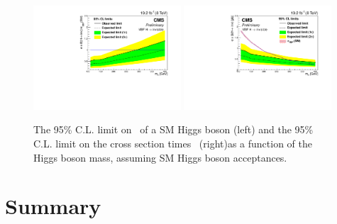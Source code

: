 \begin{figure}[h!]
  \begin{center}
    \includegraphics[width=0.49\textwidth]{Chapter07/Images/vbflimit.pdf} %
    \includegraphics[width=0.49\textwidth]{Chapter07/Images/vbfxslimit.pdf}
 \caption{The 95\% C.L. limit on \BRinv\, of a SM Higgs
boson (left) and the 95\% C.L. limit on the cross section times
\BRinv\, (right)as a function of the Higgs
boson mass, assuming SM Higgs boson acceptances. \cite{ARTICLE:CMSVBFHiggsInvisibleParkedAnalysisPAS}}
    \label{fig:limits}
  \end{center}
\end{figure}


\section{Summary}
\label{SECTION:ParkedDataAnalysis_Summary}



